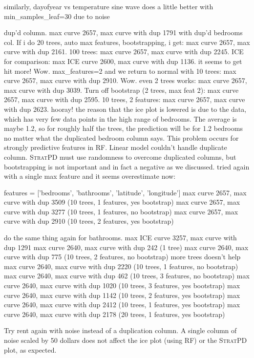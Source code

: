 \documentclass[12pt]{article}
\newcommand{\spd}{\fontfamily{cmr}\textsc{\small StratPD}}
\begin{document}
{similarly, dayofyear vs temperature sine wave does a little better with min\_samples\_leaf=30 due to noise

dup'd column. max curve 2657, max curve with dup 1791 with dup'd bedrooms col.  If i do 20 trees, auto max features, bootstrapping, i get: max curve 2657, max curve with dup 2161. 100 trees: max curve 2657, max curve with dup 2245. ICE for comparison: max ICE curve 2600, max curve with dup 1136. it seems to get hit more! Wow. max\_features=2 and we return to normal with 10 trees: max curve 2657, max curve with dup 2910. Wow. even 2 trees works: max curve 2657, max curve with dup 3039. Turn off bootstrap (2 trees, max feat 2): max curve 2657, max curve with dup 2595. 10 trees, 2 features: max curve 2657, max curve with dup 2623. hooray!  the reason that the ice plot is lowered is due to the data, which has very few data points in the high range of bedrooms. The average is maybe 1.2, so for roughly half the trees, the prediction will be for 1.2 bedrooms no matter what the duplicated bedroom column says.  This problem occurs for strongly predictive features in RF. Linear model couldn't handle duplicate column. \spd{} must use randomness to overcome duplicated columns, but bootstrapping is not important and in fact a negative as we discussed.   tried again with a single max feature and it seems overestimate now:

features = ['bedrooms', 'bathrooms', 'latitude', 'longitude']
max curve 2657, max curve with dup 3509 (10 trees, 1 features, yes bootstrap)
max curve 2657, max curve with dup 3277 (10 trees, 1 features, no bootstrap)
max curve 2657, max curve with dup 2910 (10 trees, 2 features, yes bootstrap)

do the same thing again for bathrooms.
max ICE curve 3257, max curve with dup 1291
max curve 2640, max curve with dup 242 (1 tree)
max curve 2640, max curve with dup 775 (10 trees, 2 features, no bootstrap) more trees doesn't help
max curve 2640, max curve with dup 2220 (10 trees, 1 features, no bootstrap)
max curve 2640, max curve with dup 462 (10 trees, 3 features, no bootstrap)
max curve 2640, max curve with dup 1020 (10 trees, 3 features, yes bootstrap)
max curve 2640, max curve with dup 1142 (10 trees, 2 features, yes bootstrap)
max curve 2640, max curve with dup 2412 (10 trees, 1 features, yes bootstrap)
max curve 2640, max curve with dup 2178 (20 trees, 1 features, yes bootstrap)

Try rent again with noise instead of a duplication column. A single column of noise scaled by 50 dollars does not affect the ice plot (using RF) or the \spd{} plot, as expected.

}
\end{document}
